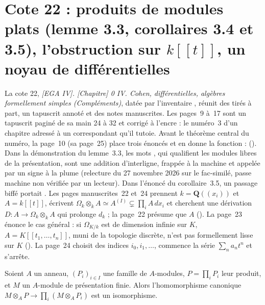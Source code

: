 \section[Cote 22 : produits de modules plats (lemme 3.3, corollaires 3.4 et 3.5), l'obstruction sur {$k[[t]]$}, un noyau de différentielles]{Cote 22 : produits de modules plats (lemme 3.3, corollaires 3.4 et 3.5), l'obstruction sur $k[[t]]$, un noyau de différentielles\protect{}}\label{sec:22}

La cote 22, \emph{[EGA IV]. [Chapitre] 0 IV. Cohen, différentielles, algèbres formellement simples (Compléments)}, datée par l'inventaire , réunit des tirés à part, un tapuscrit annoté et des notes manuscrites. Les pages~9 à~17 sont un tapuscrit paginé de sa main 24 à 32 et corrigé à l'encre : le numéro~3 d'un chapitre adressé à un correspondant qu'il tutoie. Avant le théorème central du numéro, la page~10 (sa page~25) place trois énoncés et en donne la fonction :  (). Dans la démonstration du lemme~3.3, les mots , qui qualifient les modules libres de la présentation, sont une addition d'interligne, frappée à la machine et appelée par un signe à la plume (relecture du 27 novembre 2026 sur le fac-similé, passe machine non vérifiée par un lecteur). Dans l'énoncé du corollaire~3.5, un passage biffé portait . Les pages manuscrites~22 et~24 prennent $k = \mathbf Q((x_i))$ et $A = k[[t]]$, écrivent $\Omega_k \otimes_k A \simeq A^{(I)} \subsetneq \prod_i A\,dx_i$ et cherchent une dérivation $D : A \to \Omega_k \otimes_k A$ qui prolonge $d_k$ ; la page~22 présume que $A$  (). La page~23 énonce le cas général : si $\Omega_{K/k}$ est de dimension infinie sur $K$, $A = K[[t_1, \ldots, t_n]]$, muni de la topologie discrète, n'est pas formellement lisse sur $K$ (). La page~24 choisit des indices $i_0, i_1, \ldots$, commence la série $\sum_n a_n t^n$ et s'arrête.

\begin{enonce}[Lemme 3.3]
Soient $A$ un anneau, $(P_i)_{i \in I}$ une famille de $A$-modules, $P = \prod_i P_i$ leur produit, et $M$ un $A$-module de présentation finie. Alors l'homomorphisme canonique $M \otimes_A P \to \prod_i (M \otimes_A P_i)$ est un isomorphisme.
\end{enonce}


